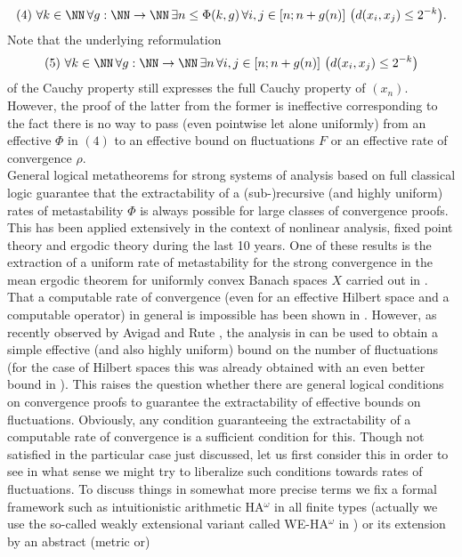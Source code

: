 \[ (4) \ \forall k\in\NN\,\forall g:\NN\to\NN\, \exists n\le \Phi(k,g) 
\,\forall i,j \in [n;n+g(n)]\ \big( d(x_i,x_j)\le 2^{-k}\big). \]
Note that the underlying reformulation 
\[ (5) \ \forall k\in \NN\,\forall g:\NN\to\NN\, \exists n
\,\forall i,j \in [n;n+g(n)]\ \big( d(x_i,x_j)\le 2^{-k}\big) \]
of the Cauchy property 
still expresses the full Cauchy property of $(x_n).$ However, the proof 
of the latter from the former is ineffective corresponding to the fact 
there is no way to 
pass (even pointwise let alone uniformly) 
from an effective $\Phi$ in $(4)$ to an 
effective bound on fluctuations $F$ or an effective rate of convergence $\rho.$
\\[2mm] General logical metatheorems for strong systems of analysis based 
on full classical logic guarantee that the extractability of a (sub-)recursive 
(and highly uniform) rates of metastability $\Phi$ is always possible for 
large classes of convergence proofs. This has been applied extensively in 
the context of nonlinear analysis, fixed point theory and ergodic theory 
during the last 10 years. One of these results is the extraction of a 
uniform rate of metastability for the strong convergence in the mean 
ergodic theorem for uniformly convex Banach spaces $X$ carried out in 
\cite{Kohlenbach/Leustean4}. That a computable rate of convergence (even 
for an effective Hilbert space and a computable operator) in general 
is impossible has been shown in \cite{Avigad/Gerhardy/Towsner}. However, 
as recently observed by Avigad and Rute \cite{Avigad/Rute}, the analysis 
in \cite{Kohlenbach/Leustean4} can be used to obtain a simple effective (and 
also highly uniform) 
bound on the number of fluctuations (for the case of Hilbert spaces this 
was already obtained with an even better bound in \cite{Jones}). This 
raises the question whether there are general logical conditions on 
convergence proofs to guarantee the extractability of effective bounds 
on fluctuations. Obviously, any condition guaranteeing the extractability of 
a computable rate of convergence is a sufficient condition for this. Though 
not satisfied in the particular case just discussed, let us first consider 
this in order to see in what sense we might try to liberalize such conditions 
towards rates of fluctuations. To discuss things in somewhat more precise 
terms we fix a formal framework such as intuitionistic arithmetic 
HA$^{\omega}$ in all finite types (actually we use the so-called weakly 
extensional variant called WE-HA$^{\omega}$ in \cite{Kohlenbach08}) 
or its extension by an abstract (metric or) 
